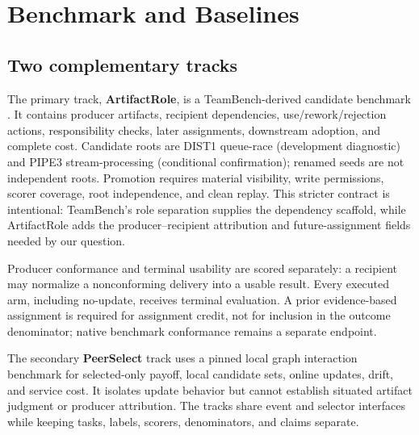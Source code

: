 \documentclass[sigconf,anonymous]{aamas}
\begin{document}
\section{Benchmark and Baselines}
\label{sec:benchmark}

\subsection{Two complementary tracks}
The primary track, \textbf{ArtifactRole}, is a TeamBench-derived candidate benchmark \cite{kim2026teambench}. It contains producer artifacts, recipient dependencies, use/rework/rejection actions, responsibility checks, later assignments, downstream adoption, and complete cost. Candidate roots are DIST1 queue-race (development diagnostic) and PIPE3 stream-processing (conditional confirmation); renamed seeds are not independent roots. Promotion requires material visibility, write permissions, scorer coverage, root independence, and clean replay. This stricter contract is intentional: TeamBench's role separation supplies the dependency scaffold, while ArtifactRole adds the producer--recipient attribution and future-assignment fields needed by our question.

Producer conformance and terminal usability are scored separately: a recipient may normalize a nonconforming delivery into a usable result. Every executed arm, including no-update, receives terminal evaluation. A prior evidence-based assignment is required for assignment credit, not for inclusion in the outcome denominator; native benchmark conformance remains a separate endpoint.

The secondary \textbf{PeerSelect} track uses a pinned local graph interaction benchmark for selected-only payoff, local candidate sets, online updates, drift, and service cost. It isolates update behavior but cannot establish situated artifact judgment or producer attribution. The tracks share event and selector interfaces while keeping tasks, labels, scorers, denominators, and claims separate.
\end{document}
